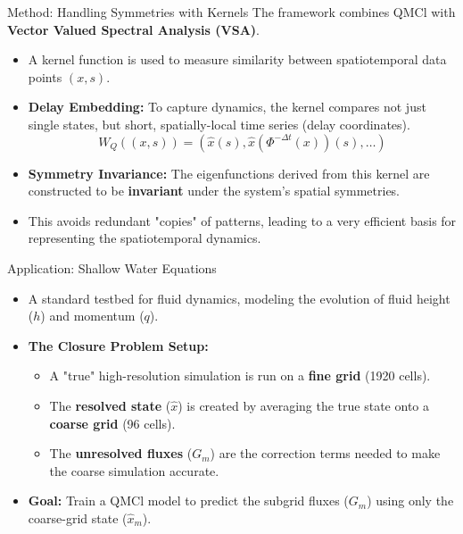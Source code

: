 \documentclass{beamer}
\begin{document}
\begin{frame}{Method: Handling Symmetries with Kernels}
    The framework combines QMCl with \textbf{Vector Valued Spectral Analysis (VSA)}.
    \begin{itemize}
        \item A kernel function is used to measure similarity between spatiotemporal data points $(x, s)$.
        \item \textbf{Delay Embedding:} To capture dynamics, the kernel compares not just single states, but short, spatially-local time series (delay coordinates).
        \[ W_Q((x,s)) = (\hat{x}(s), \hat{x}(\Phi^{-\Delta t}(x))(s), \dots) \]
        \item \textbf{Symmetry Invariance:} The eigenfunctions derived from this kernel are constructed to be \textbf{invariant} under the system's spatial symmetries.
        \item This avoids redundant "copies" of patterns, leading to a very efficient basis for representing the spatiotemporal dynamics.
    \end{itemize}
\end{frame}

\begin{frame}{Application: Shallow Water Equations}
    \begin{itemize}
        \item A standard testbed for fluid dynamics, modeling the evolution of fluid height ($h$) and momentum ($q$).
        \item \textbf{The Closure Problem Setup:}
        \begin{itemize}
            \item A "true" high-resolution simulation is run on a \textbf{fine grid} (1920 cells).
            \item The \textbf{resolved state} ($\hat{x}$) is created by averaging the true state onto a \textbf{coarse grid} (96 cells).
            \item The \textbf{unresolved fluxes} ($G_m$) are the correction terms needed to make the coarse simulation accurate.
        \end{itemize}
        \item \textbf{Goal:} Train a QMCl model to predict the subgrid fluxes ($G_m$) using only the coarse-grid state ($\hat{x}_m$).
    \end{itemize}
\end{frame}
\end{document}
